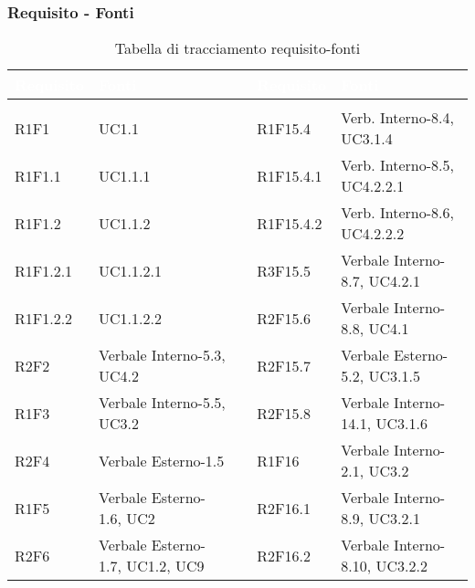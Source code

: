 \subsubsection{Requisito - Fonti}
\renewcommand{\arraystretch}{1.5}
\begin{center}
\begin{longtable}{C{2cm} | C{5cm} C{0.2cm} C{2cm} | C{5cm}}
		\textcolor{white}{\textbf{Requisito}} & 
		\textcolor{white}{\textbf{Fonti}}&
		 & 
		\textcolor{white}{\textbf{Requisito}} & 
		\textcolor{white}{\textbf{Fonti}}\\
		\endfirsthead
	    \\
	    \endfoot
	    \caption{Tabella di tracciamento requisito-fonti}
	    \endlastfoot


R1F1 & UC1.1 &  & R1F15.4 & Verb. Interno-8.4, UC3.1.4 \\

R1F1.1 & UC1.1.1 &  & R1F15.4.1 & Verb. Interno-8.5, UC4.2.2.1 \\

R1F1.2 & UC1.1.2 &  & R1F15.4.2 & Verb. Interno-8.6, UC4.2.2.2 \\

R1F1.2.1 & UC1.1.2.1 &  & R3F15.5 & Verbale Interno-8.7, UC4.2.1 \\

R1F1.2.2 & UC1.1.2.2 &  & R2F15.6 & Verbale Interno-8.8, UC4.1 \\

R2F2 & Verbale Interno-5.3, UC4.2 &  & R2F15.7 & Verbale Esterno-5.2, UC3.1.5 \\

R1F3 & Verbale Interno-5.5, UC3.2 &  & R2F15.8 & Verbale Interno-14.1, UC3.1.6 \\

R2F4 & Verbale Esterno-1.5 &  & R1F16 & Verbale Interno-2.1, UC3.2 \\

R1F5 & Verbale Esterno-1.6, UC2 &  & R2F16.1 & Verbale Interno-8.9, UC3.2.1 \\

R2F6 & Verbale Esterno-1.7, UC1.2, UC9 &  & R2F16.2 & Verbale Interno-8.10, UC3.2.2 \\


\end{longtable}
\end{center}
